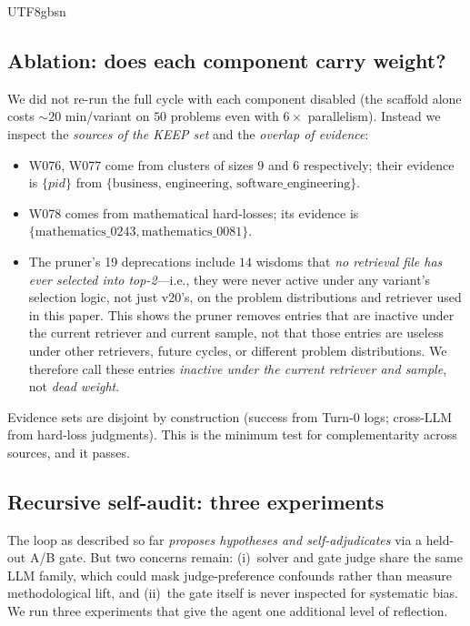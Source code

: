 \documentclass{article}
\begin{document}
\begin{CJK*}{UTF8}{gbsn}
\subsection{Ablation: does each component carry weight?}
\label{sec:ablation}

We did not re-run the full cycle with each component disabled (the
scaffold alone costs \({\sim}20\) min/variant on \(50\) problems even
with \(6\times\) parallelism). Instead we inspect the \emph{sources of
the KEEP set} and the \emph{overlap of evidence}:

\begin{itemize}[leftmargin=*,topsep=2pt,itemsep=1pt]
  \item W076, W077 come from clusters of sizes \(9\) and \(6\)
    respectively; their evidence is \(\{pid\}\) from
    \(\{\text{business, engineering, software\_engineering}\}\).
  \item W078 comes from mathematical hard-losses; its evidence is
    \(\{\mathrm{mathematics\_0243, mathematics\_0081}\}\).
  \item The pruner's 19 deprecations include \(14\) wisdoms that
    \emph{no retrieval file has ever selected into top-2}---i.e.,
    they were never active under any variant's selection logic,
    not just v20's, on the problem distributions and retriever
    used in this paper. This shows the pruner removes entries
    that are inactive under the current retriever and current
    sample, not that those entries are useless under other
    retrievers, future cycles, or different problem distributions.
    We therefore call these entries \emph{inactive under the
    current retriever and sample}, not \emph{dead weight}.
\end{itemize}

\noindent Evidence sets are disjoint by construction (success from
Turn-0 logs; cross-LLM from hard-loss judgments). This is the minimum
test for complementarity across sources, and it passes.

\subsection{Recursive self-audit: three experiments}
\label{sec:selfaudit}

The loop as described so far \emph{proposes hypotheses and
self-adjudicates} via a held-out A/B gate. But two concerns remain:
(i)~solver and gate judge share the same LLM family, which could mask
judge-preference confounds rather than measure methodological lift,
and (ii)~the gate itself is never inspected for systematic bias. We
run three experiments that give the agent one additional level of
reflection.


\end{CJK*}
\end{document}
